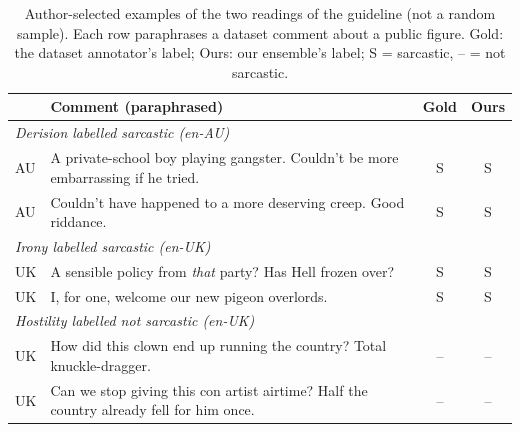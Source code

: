 \documentclass[11pt]{article}
\begin{document}
\begin{table}[t]
\centering\small
\setlength{\tabcolsep}{4pt}
\begin{tabular}{lp{4.4cm}cc}
\toprule
 & Comment (paraphrased) & Gold & Ours \\
\midrule
\multicolumn{4}{l}{\emph{Derision labelled sarcastic (en-AU)}} \\
AU & A private-school boy playing gangster. Couldn't be more embarrassing if he tried. & S & S \\
AU & Couldn't have happened to a more deserving creep. Good riddance. & S & S \\
\multicolumn{4}{l}{\emph{Irony labelled sarcastic (en-UK)}} \\
UK & A sensible policy from \emph{that} party? Has Hell frozen over? & S & S \\
UK & I, for one, welcome our new pigeon overlords. & S & S \\
\multicolumn{4}{l}{\emph{Hostility labelled not sarcastic (en-UK)}} \\
UK & How did this clown end up running the country? Total knuckle-dragger. & -- & -- \\
UK & Can we stop giving this con artist airtime? Half the country already fell for him once. & -- & -- \\
\bottomrule
\end{tabular}
\caption{Author-selected examples of the two readings of the guideline (not a random sample). Each row paraphrases a
dataset comment about a public figure. Gold: the dataset annotator's label; Ours: our ensemble's label; S = sarcastic,
-- = not sarcastic.}
\label{tab:examples}
\end{table}
\end{document}
